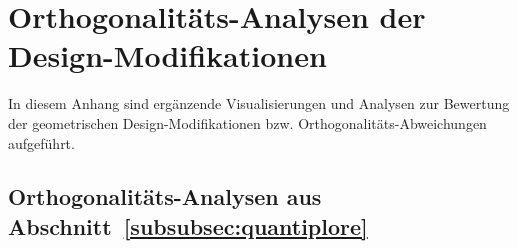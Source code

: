 
\section{Orthogonalitäts-Analysen der Design-Modifikationen}
\label{app:c}

In diesem Anhang sind ergänzende Visualisierungen und Analysen zur Bewertung der geometrischen Design-Modifikationen bzw. Orthogonalitäts-Abweichungen aufgeführt.

\subsection{Orthogonalitäts-Analysen aus Abschnitt~\ref{subsubsec:quantiplore}}









